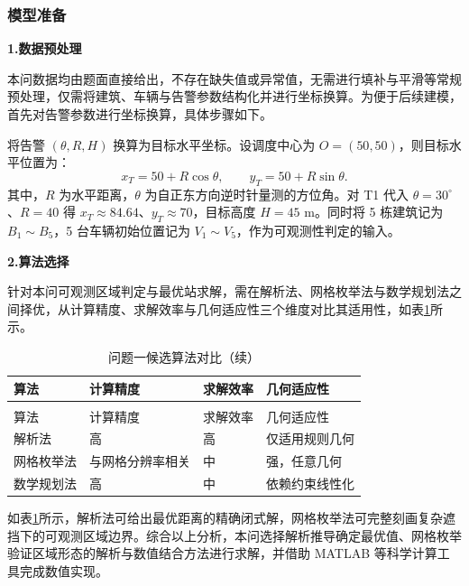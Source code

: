 
\subsubsection{模型准备}

\textbf{1.数据预处理}

本问数据均由题面直接给出，不存在缺失值或异常值，无需进行填补与平滑等常规预处理，仅需将建筑、车辆与告警参数结构化并进行坐标换算。为便于后续建模，首先对告警参数进行坐标换算，具体步骤如下。

将告警 $(\theta,R,H)$ 换算为目标水平坐标。设调度中心为 $O=(50,50)$，则目标水平位置为：
\begin{equation}
    x_T = 50 + R\cos\theta, \qquad y_T = 50 + R\sin\theta .
\end{equation}
其中，$R$ 为水平距离，$\theta$ 为自正东方向逆时针量测的方位角。对 T1 代入 $\theta=30^\circ$、$R=40$ 得 $x_T\approx 84.64$、$y_T\approx 70$，目标高度 $H=45$ m。同时将 5 栋建筑记为 $B_1\sim B_5$，5 台车辆初始位置记为 $V_1\sim V_5$，作为可观测性判定的输入。

\textbf{2.算法选择}

针对本问可观测区域判定与最优站求解，需在解析法、网格枚举法与数学规划法之间择优，从计算精度、求解效率与几何适应性三个维度对比其适用性，如表\ref{tab:algo1}所示。

\begin{longtable}{>{\centering\arraybackslash}p{}>{\centering\arraybackslash}p{}>{\centering\arraybackslash}p{}>{\centering\arraybackslash}p{}}
  \caption{问题一候选算法对比}
  \label{tab:algo1} \\
  \toprule
  算法 & 计算精度 & 求解效率 & 几何适应性 \\
  \midrule
  \endfirsthead
  \caption{问题一候选算法对比（续）} \\
  \toprule
  算法 & 计算精度 & 求解效率 & 几何适应性 \\
  \midrule
  \endhead
  \bottomrule
  \endfoot
  解析法 & 高 & 高 & 仅适用规则几何 \\
  网格枚举法 & 与网格分辨率相关 & 中 & 强，任意几何 \\
  数学规划法 & 高 & 中 & 依赖约束线性化 \\
\end{longtable}

如表\ref{tab:algo1}所示，解析法可给出最优距离的精确闭式解，网格枚举法可完整刻画复杂遮挡下的可观测区域边界。综合以上分析，本问选择解析推导确定最优值、网格枚举验证区域形态的解析与数值结合方法进行求解，并借助 MATLAB 等科学计算工具完成数值实现\cite{zhuo2014matlab}。
